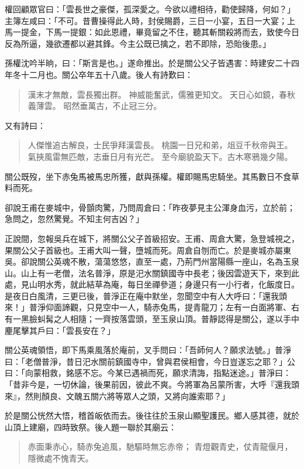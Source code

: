 權回顧眾官曰：「雲長世之豪傑，孤深愛之。今欲以禮相待，勸使歸降，何如？」主簿左咸曰：「不可。昔曹操得此人時，封侯賜爵，三日一小宴，五日一大宴；上馬一提金，下馬一提銀：如此恩禮，畢竟留之不住，聽其斬關殺將而去，致使今日反為所逼，幾欲遷都以避其鋒。今主公既已擒之，若不即除，恐貽後患。」

孫權沈吟半晌，曰：「斯言是也。」遂命推出。於是關公父子皆遇害：時建安二十四年冬十二月也。關公卒年五十八歲。後人有詩歎曰：

\begin{quote}
漢末才無敵，雲長獨出群。
神威能奮武，儒雅更知文。
天日心如鏡，春秋義薄雲。
昭然垂萬古，不止冠三分。
\end{quote}

又有詩曰：

\begin{quote}
人傑惟追古解良，士民爭拜漢雲長。
桃園一日兄和弟，俎豆千秋帝與王。
氣挾風雷無匹敵，志垂日月有光芒。
至今廟貌盈天下。古木寒鴉幾夕陽。
\end{quote}

關公既歿，坐下赤兔馬被馬忠所獲，獻與孫權。權即賜馬忠騎坐。其馬數日不食草料而死。

卻說王甫在麥城中，骨顫肉驚，乃問周倉曰：「昨夜夢見主公渾身血污，立於前；急問之，忽然驚覺。不知主何吉凶？」

正說間，忽報吳兵在城下，將關公父子首級招安。王甫、周倉大驚，急登城視之，果關公父子首級也。王甫大叫一聲，墮城而死。周倉自刎而亡。於是麥城亦屬東吳。卻說關公英魂不散，蕩蕩悠悠，直至一處，乃荊門州當陽縣一座山，名為玉泉山。山上有一老僧，法名普淨，原是汜水關鎮國寺中長老；後因雲遊天下，來到此處，見山明水秀，就此結草為庵，每日坐禪參道；身邊只有一小行者，化飯度日。是夜日白風清，三更已後，普淨正在庵中默坐，忽聞空中有人大呼曰：「還我頭來！」普淨仰面諦觀，只見空中一人，騎赤兔馬，提青龍刀；左有一白面將軍、右有一黑臉虯髯之人相隨；一齊按落雲頭，至玉泉山頂。普靜認得是關公，遂以手中麈尾擊其戶曰：「雲長安在？」

關公英魂領悟，即下馬乘風落於庵前，叉手問曰：「吾師何人？願求法號。」普淨曰：「老僧普淨，昔日汜水關前鎮國寺中，曾與君侯相會，今日豈遂忘之耶？」公曰：「向蒙相救，銘感不忘。今某已遇禍而死，願求清誨，指點迷途。」普淨曰：「昔非今是，一切休論，後果前因，彼此不爽。今將軍為呂蒙所害，大呼『還我頭來』，然則顏良、文醜五關六將等眾人之頭，又將向誰索耶？」

於是關公恍然大悟，稽首皈依而去。後往往於玉泉山顯聖護民。鄉人感其德，就於山頂上建廟，四時致祭。後人題一聯於其廟云：

\begin{quote}
赤面秉赤心，騎赤兔追風，馳驅時無忘赤帝；
青燈觀青史，仗青龍偃月，隱微處不愧青天。
\end{quote}

